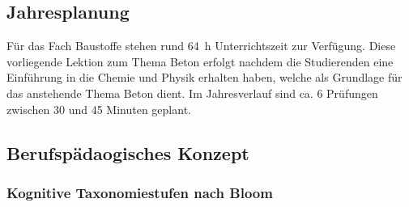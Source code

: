 \documentclass[
11pt,
captions=tableheading,
smallheadings,
headsepline,
footsepline, 
captions=tableheading,
parskip=half-,
]{scrartcl}
\begin{document}
\subsection{Jahresplanung}
Für das Fach Baustoffe stehen rund \SI{64}{\hour} Unterrichtszeit zur Verfügung.
Diese vorliegende Lektion zum Thema Beton erfolgt nachdem die Studierenden eine Einführung in die Chemie und Physik erhalten haben, welche als Grundlage für das anstehende Thema Beton dient.
Im Jahresverlauf sind ca. 6 Prüfungen zwischen 30 und 45 Minuten geplant.





\subsection{Berufspädaogisches Konzept}
\subsubsection{Kognitive Taxonomiestufen nach Bloom}
\end{document}
